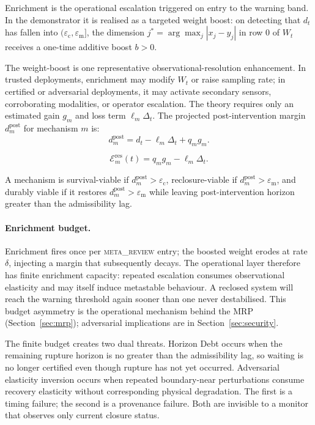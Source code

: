 \documentclass{llncs}
\newcommand{\ecollapse}{\varepsilon_{\mathrm{c}}}
\newcommand{\emeta}{\varepsilon_{\mathrm{m}}}
\newcommand{\st}[1]{\textup{\textsc{#1}}}
\begin{document}
Enrichment is the operational escalation triggered on entry to the
warning band. In the demonstrator it is realised as a targeted weight
boost: on detecting that $d_t$ has fallen into
$(\ecollapse, \emeta]$, the dimension $j^* = \arg\max_j |x_j - y_j|$
in row 0 of $W_t$ receives a one-time additive boost $b > 0$.

The weight-boost is one representative observational-resolution
enhancement. In trusted deployments, enrichment may modify $W_t$ or raise
sampling rate; in certified or adversarial deployments, it may activate
secondary sensors, corroborating modalities, or operator escalation. The
theory requires only an estimated gain $g_m$ and loss term $\ell_m\Delta_t$.
The projected post-intervention margin $d^{\mathrm{post}}_m$ for mechanism $m$ is:
\[
d^{\mathrm{post}}_m = d_t - \ell_m \Delta_t + q_m g_m .
\]

\[
\mathcal{E}^{\mathrm{res}}_m(t) = q_m g_m - \ell_m \Delta_t .
\]

A mechanism is survival-viable if $d^{\mathrm{post}}_m > \ecollapse$, reclosure-viable if $d^{\mathrm{post}}_m > \emeta$, and durably viable if it restores $d^{\mathrm{post}}_m > \emeta$ while leaving post-intervention horizon greater than the admissibility lag.

\paragraph{Enrichment budget.}
Enrichment fires once per \st{meta\_review} entry; the boosted weight
erodes at rate $\delta$, injecting a margin that subsequently decays.
The operational layer therefore has finite enrichment capacity: repeated
escalation consumes observational elasticity and may itself induce
metastable behaviour. A reclosed system will reach the warning threshold
again sooner than one never destabilised. This budget asymmetry is the
operational mechanism behind the MRP (Section~\ref{sec:mrp}); adversarial
implications are in Section~\ref{sec:security}.

The finite budget creates two dual threats. Horizon Debt occurs when the
remaining rupture horizon is no greater than the admissibility lag, so
waiting is no longer certified even though rupture has not yet occurred.
Adversarial elasticity inversion occurs when repeated boundary-near
perturbations consume recovery elasticity without corresponding physical
degradation. The first is a timing failure; the second is a provenance
failure. Both are invisible to a monitor that observes only current
closure status.
\end{document}
